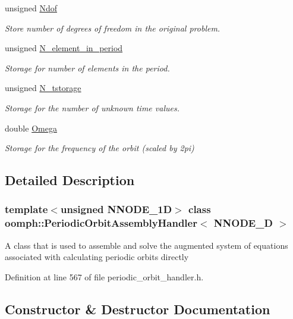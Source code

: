 \begin{DoxyCompactItemize}
unsigned \hyperlink{classoomph_1_1PeriodicOrbitAssemblyHandler_aa04e0d8d17e69d64d53df7f9d7369fad}{Ndof}
\begin{DoxyCompactList}\small\item\em Store number of degrees of freedom in the original problem. \end{DoxyCompactList}\item 
unsigned \hyperlink{classoomph_1_1PeriodicOrbitAssemblyHandler_a52b49ec4c94b9cf480395c7cad123ced}{N\+\_\+element\+\_\+in\+\_\+period}
\begin{DoxyCompactList}\small\item\em Storage for number of elements in the period. \end{DoxyCompactList}\item 
unsigned \hyperlink{classoomph_1_1PeriodicOrbitAssemblyHandler_ada223550212a4e5e5b6838f96e5a2170}{N\+\_\+tstorage}
\begin{DoxyCompactList}\small\item\em Storage for the number of unknown time values. \end{DoxyCompactList}\item 
double \hyperlink{classoomph_1_1PeriodicOrbitAssemblyHandler_ae922867706dcf2e79e837bbbe774e053}{Omega}
\begin{DoxyCompactList}\small\item\em Storage for the frequency of the orbit (scaled by 2pi) \end{DoxyCompactList}\end{DoxyCompactItemize}


\subsection{Detailed Description}
\subsubsection*{template$<$unsigned N\+N\+O\+D\+E\+\_\+1D$>$\newline
class oomph\+::\+Periodic\+Orbit\+Assembly\+Handler$<$ N\+N\+O\+D\+E\+\_\+D $>$}

A class that is used to assemble and solve the augmented system of equations associated with calculating periodic orbits directly 

Definition at line 567 of file periodic\+\_\+orbit\+\_\+handler.\+h.



\subsection{Constructor \& Destructor Documentation}
\mbox{\label{classoomph_1_1PeriodicOrbitAssemblyHandler_abe3fe6f2f74260df121bbf115ef3a5ee}} 
